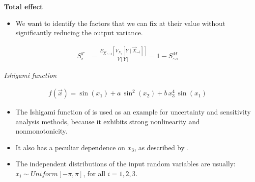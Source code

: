 \begin{frame}\textbf{Total effect}\vspace{0.3cm}

\begin{itemize}
\item We want to identify the factors that we can fix at their value without significantly reducing the output variance.
\end{itemize}

\begin{align*}
S^T_i & = \frac{E_{\vec{X} \sim i}[V_{X_i}[Y \mid \vec{X}_{\sim i}]]}{V[Y]} = 1 - S^M_{\sim i}
\end{align*}

\end{frame}
\begin{frame}\begin{center}
		\LARGE\textit{Ishigami function}

		\begin{align*}
				f(\vec{x}) = \sin(x_1) + a\, \sin^2 (x_2) + b\, x_3^4\, \sin(x_1)
		\end{align*}

\end{center}\end{frame}
\begin{frame}

	\begin{itemize}\setlength\itemsep{1em}
		\item The Ishigami function of  is used as an example for uncertainty and sensitivity analysis methods, because it exhibits strong nonlinearity and nonmonotonicity.

		\item It also has a peculiar dependence on $x_3$, as described by .

		 \item The independent distributions of the input random variables are usually: $x_i \sim Uniform[-\pi, \pi]$, for all $i = 1, 2, 3$.
	\end{itemize}

\end{frame}

